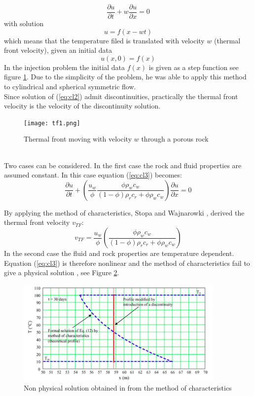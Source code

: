 \begin{equation}
\frac{\partial u}{\partial t} +w\frac{ \partial u }{\partial x}=0	\nonumber		       
\end{equation}
with solution
\begin{equation}
u = f(x-wt)  \nonumber
\end{equation}
which means that the temperature filed is translated with velocity $w$ (thermal front velocity), given an initial data 
\begin{equation}
u(x,0) = f(x) \nonumber
\end{equation}
In the injection problem the initial data $f(x)$ is given as a step function see figure \ref{fig:tf1}. Due to the simplicity of the problem, he was able to apply  this method to cylindrical and spherical symmetric flow.
\\
Since solution of (\ref{eq:cl2}) admit discontinuities, practically the thermal front velocity is the velocity of the discontinuity solution.
\begin{figure}[H] %
   \centering
   \texttt{[image: tf1.png]} 
   \caption{Thermal front moving with velocity $w$ through a porous rock}
   \label{fig:tf1}
\end{figure}
\\
Two cases can be considered. In the first case the rock and fluid properties are assumed constant. In this case equation (\ref{eq:cl3}) becomes:
\begin{equation}
\frac{\partial u}{\partial t}+\left( \frac{u_{w}}{\phi} \frac{\phi\rho_{w}c_{w}}{(1-\phi)\rho_{r}c_{r}+\phi\rho_{w}c_{w}} \right)\frac{\partial u }{\partial x} = 0
\end{equation}

By applying the method of characteristics, Stopa and Wajnarowki  \cite{Waj05}, derived the thermal front velocity $v_{TF}$:
\begin{equation}
v_{TF} =  \frac{u_{w}}{\phi} \left(\frac{\phi\rho_{w}c_{w}}{(1-\phi)\rho_{r}c_{r}+\phi\rho_{w}c_{w}} \right)
\end{equation}
In the second case the fluid and rock properties are temperature dependent. Equation (\ref{eq:cl3}) is therefore nonlinear and the method of characteristics fail to give a physical solution \cite{Waj05, Risebro07}, see Figure \ref{fig:nonp}.

\begin{figure}[H] %
   \centering
   \includegraphics[width=4in]{np.png} 
   \caption{Non physical solution obtained in \cite{Waj05} from the method of characteristics}
   \label{fig:nonp}
\end{figure}

